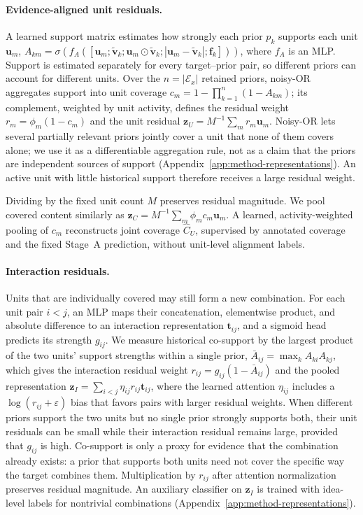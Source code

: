 \paragraph{Evidence-aligned unit residuals.}
\label{sec:method-unit-residual}
A learned support matrix estimates how strongly each prior $p_k$ supports each
unit $\boldsymbol{u}_m$,
$A_{km}=\sigma(f_A([\boldsymbol{u}_m;\widetilde{\boldsymbol{v}}_k;
\boldsymbol{u}_m\odot\widetilde{\boldsymbol{v}}_k;
|\boldsymbol{u}_m-\widetilde{\boldsymbol{v}}_k|;\boldsymbol{f}_k]))$, where
$f_A$ is an MLP. Support is estimated separately for every target--prior pair,
so different priors can account for different units. Over the
$n=|\mathcal{E}_x|$ retained priors, noisy-OR \citep{pearl1988probabilistic}
aggregates support into unit
coverage $c_m=1-\prod_{k=1}^{n}(1-A_{km})$; its complement, weighted by unit
activity, defines the residual weight $r_m=\phi_m(1-c_m)$ and the unit residual
$\boldsymbol{z}_U=M^{-1}\sum_m r_m\boldsymbol{u}_m$. Noisy-OR lets several
partially relevant priors jointly cover a unit that none of them covers alone;
we use it as a differentiable aggregation rule, not as a claim that the priors
are independent sources of support
(Appendix~\ref{app:method-representations}). An active unit with little
historical support therefore receives a large residual weight.

Dividing by the fixed unit count $M$ preserves residual magnitude. We pool
covered content similarly as
$\boldsymbol{z}_C=M^{-1}\sum_m\phi_mc_m\boldsymbol{u}_m$.
A learned, activity-weighted pooling of $c_m$ reconstructs joint coverage
$\widehat C_U$, supervised by annotated coverage and the fixed Stage~A
prediction, without unit-level alignment labels.

\paragraph{Interaction residuals.}
\label{sec:method-interaction}
Units that are individually covered may still form a new combination. For each
unit pair $i<j$, an MLP maps their concatenation, elementwise product, and
absolute difference to an interaction representation $\boldsymbol{t}_{ij}$,
and a sigmoid head predicts its strength $g_{ij}$. We measure historical
co-support by the largest product of the two units' support strengths within a
single prior, $\bar{A}_{ij}=\max_k A_{ki}A_{kj}$, which gives the interaction
residual weight $r_{ij}=g_{ij}(1-\bar{A}_{ij})$ and the pooled representation
$\boldsymbol{z}_I=\sum_{i<j}\eta_{ij}r_{ij}\boldsymbol{t}_{ij}$, where the
learned attention $\eta_{ij}$ includes a $\log(r_{ij}+\varepsilon)$ bias that
favors pairs with larger residual weights. When different priors support the
two units but no single prior strongly supports both, their unit residuals can
be small while their interaction residual remains large, provided that
$g_{ij}$ is high. Co-support is only a proxy for evidence that the combination already exists: a prior that supports both units need not cover the specific
way the target combines them. Multiplication by $r_{ij}$ after attention normalization preserves residual
magnitude. An auxiliary classifier on $\boldsymbol{z}_I$ is
trained with idea-level labels for nontrivial combinations
(Appendix~\ref{app:method-representations}).


